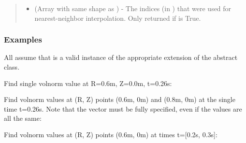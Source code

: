 \documentclass[letterpaper,10pt,english]{sphinxmanual}
\begin{document}
\begin{fulllineitems}
\begin{fulllineitems}
\begin{quote}
\begin{description}
\begin{itemize}
\item {} 
 (Array with same shape as ) - The indices
(in ) that were used for
nearest-neighbor interpolation. Only returned if  is
True.

\end{itemize}


\end{description}\end{quote}
\subsubsection*{Examples}

All assume that  is a valid instance of the appropriate
extension of the {\hyperref[\detokenize{eqtools:eqtools.core.Equilibrium}]{}} abstract class.

Find single volnorm value at R=0.6m, Z=0.0m, t=0.26s:

\begin{sphinxVerbatim}[commandchars=\\\{\}]
    
\end{sphinxVerbatim}

Find volnorm values at (R, Z) points (0.6m, 0m) and (0.8m, 0m) at the
single time t=0.26s. Note that the  vector must be fully specified,
even if the values are all the same:

\begin{sphinxVerbatim}[commandchars=\\\{\}]
  \PYG{p}{[} \PYG{p}{]} \PYG{p}{[} \PYG{p}{]} 
\end{sphinxVerbatim}

Find volnorm values at (R, Z) points (0.6m, 0m) at times t={[}0.2s, 0.3s{]}:

\begin{sphinxVerbatim}[commandchars=\\\{\}]
    \PYG{p}{[} \PYG{p}{]}
\end{sphinxVerbatim}


\end{fulllineitems}
\end{fulllineitems}
\end{document}
